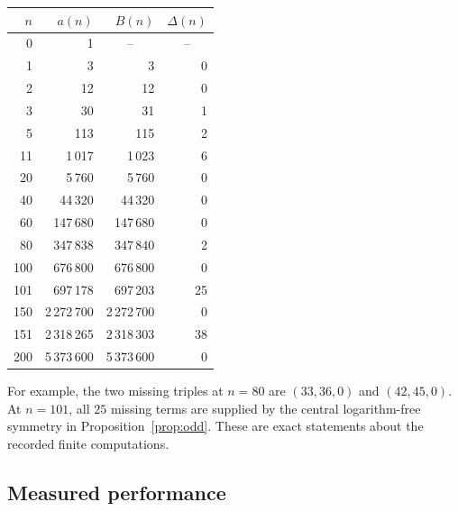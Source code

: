 \documentclass[11pt]{article}
\numberwithin{equation}{section}
\theoremstyle{definition}
\theoremstyle{remark}
\begin{document}
\begin{center}
\begin{tabular}{rrrr}
\toprule
$n$ & $a(n)$ & $B(n)$ & $\Delta(n)$\\
\midrule
0 & 1 & \multicolumn{1}{c}{--} & \multicolumn{1}{c}{--}\\
1 & 3 & 3 & 0\\
2 & 12 & 12 & 0\\
3 & 30 & 31 & 1\\
5 & 113 & 115 & 2\\
11 & 1\,017 & 1\,023 & 6\\
20 & 5\,760 & 5\,760 & 0\\
40 & 44\,320 & 44\,320 & 0\\
60 & 147\,680 & 147\,680 & 0\\
80 & 347\,838 & 347\,840 & 2\\
100 & 676\,800 & 676\,800 & 0\\
101 & 697\,178 & 697\,203 & 25\\
150 & 2\,272\,700 & 2\,272\,700 & 0\\
151 & 2\,318\,265 & 2\,318\,303 & 38\\
200 & 5\,373\,600 & 5\,373\,600 & 0\\
\bottomrule
\end{tabular}
\end{center}
For example, the two missing triples at $n=80$ are
$(33,36,0)$ and $(42,45,0)$. At $n=101$, all $25$ missing terms are supplied
by the central logarithm-free symmetry in Proposition~\ref{prop:odd}.
These are exact statements about the recorded finite computations.

\subsection{Measured performance}
\end{document}
